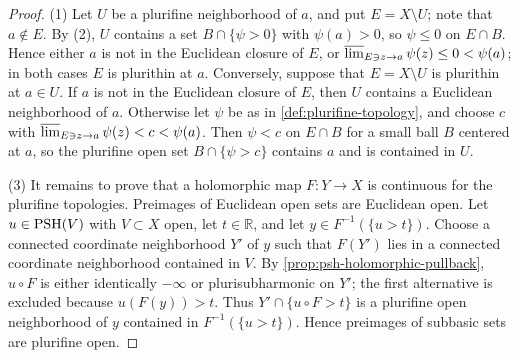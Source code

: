 \begin{proof}
(1) Let $U$ be a plurifine neighborhood of $a$, and put $E=X\setminus U$; note that $a\notin E$. By (2), $U$ contains a set $B\cap\{\psi>0\}$ with $\psi(a)>0$, so $\psi\le0$ on $E\cap B$. Hence either $a$ is not in the Euclidean closure of $E$, or $\varlimsup_{E\ni z\to a}\psi(z)\le0<\psi(a)$; in both cases $E$ is plurithin at $a$. Conversely, suppose that $E=X\setminus U$ is plurithin at $a\in U$. If $a$ is not in the Euclidean closure of $E$, then $U$ contains a Euclidean neighborhood of $a$. Otherwise let $\psi$ be as in \cref{def:plurifine-topology}, and choose $c$ with $\varlimsup_{E\ni z\to a}\psi(z)<c<\psi(a)$. Then $\psi<c$ on $E\cap B$ for a small ball $B$ centered at $a$, so the plurifine open set $B\cap\{\psi>c\}$ contains $a$ and is contained in $U$.

(3) It remains to prove that a holomorphic map $F\colon Y\to X$ is continuous for the plurifine topologies. Preimages of Euclidean open sets are Euclidean open. Let $u\in\mathrm{PSH}(V)$ with $V\subset X$ open, let $t\in\mathbb R$, and let $y\in F^{-1}(\{u>t\})$. Choose a connected coordinate neighborhood $Y'$ of $y$ such that $F(Y')$ lies in a connected coordinate neighborhood contained in $V$. By \cref{prop:psh-holomorphic-pullback}, $u\circ F$ is either identically $-\infty$ or plurisubharmonic on $Y'$; the first alternative is excluded because $u(F(y))>t$. Thus $Y'\cap\{u\circ F>t\}$ is a plurifine open neighborhood of $y$ contained in $F^{-1}(\{u>t\})$. Hence preimages of subbasic sets are plurifine open.
\end{proof}

